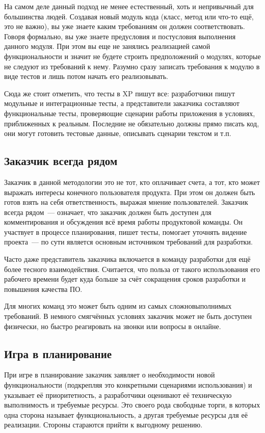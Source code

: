 \documentclass{../../text-style}
\begin{document}
На самом деле данный подход не менее естественный, хоть и непривычный для большинства людей. Создавая новый модуль кода (класс, метод или что-то ещё, это не важно), вы уже знаете каким требованиям он должен соответствовать. Говоря формально, вы уже знаете предусловия и постусловия выполнения данного модуля. При этом вы еще не занялись реализацией самой функциональности и значит не будете строить предположений о модулях, которые не следуют из требований к нему. Разумно сразу записать требования к модулю в виде тестов и лишь потом начать его реализовывать.

Сюда же стоит отметить, что тесты в XP пишут все: разработчики пишут модульные и интеграционные тесты, а представители заказчика составляют функциональные тесты, проверяющие сценарии работы приложения в условиях, приближенных к реальным. Последние не обязательно должны прямо писать код, они могут готовить тестовые данные, описывать сценарии текстом и т.п.

\subsection{Заказчик всегда рядом}

Заказчик в данной методологии это не тот, кто оплачивает счета, а тот, кто может выражать интересы конечного пользователя продукта. При этом он должен быть готов взять на себя ответственность, выражая мнение пользователей. Заказчик всегда рядом~--- означает, что заказчик должен быть доступен для комментирования и обсуждения всё время работы продуктовой команды. Он участвует в процессе планирования, пишет тесты, помогает уточнять видение проекта~--- по сути является основным источником требований для разработки.

Часто даже представитель заказчика включается в команду разработки для ещё более тесного взаимодействия. Считается, что польза от такого использования его рабочего времени будет куда больше за счёт сокращения сроков разработки и повышения качества ПО.

Для многих команд это может быть одним из самых сложновыполнимых требований. В немного смягчённых условиях заказчик может не быть доступен физически, но быстро реагировать на звонки или вопросы в онлайне.

\subsection{Игра в планирование}

При игре в планирование заказчик заявляет о необходимости новой функциональности (подкрепляя это конкретными сценариями использования) и указывает её приоритетность, а разработчики оценивают её техническую выполнимость и требуемые ресурсы. Это своего рода свободные торги, в которых одна сторона называет функциональность, а другая требуемые ресурсы для её реализации. Стороны стараются прийти к выгодному решению.
\end{document}
